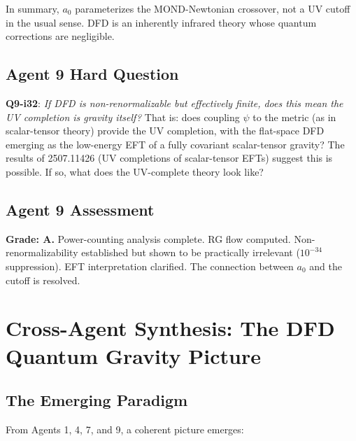\documentclass[11pt,a4paper]{article}
\begin{document}
In summary, $a_0$ parameterizes the MOND-Newtonian crossover, not a UV cutoff in the usual sense. DFD is an inherently infrared theory whose quantum corrections are negligible.

\subsection{Agent 9 Hard Question}

\textbf{Q9-i32}: \emph{If DFD is non-renormalizable but effectively finite, does this mean the UV completion is gravity itself?} That is: does coupling $\psi$ to the metric (as in scalar-tensor theory) provide the UV completion, with the flat-space DFD emerging as the low-energy EFT of a fully covariant scalar-tensor gravity? The results of 2507.11426 (UV completions of scalar-tensor EFTs) suggest this is possible. If so, what does the UV-complete theory look like?

\subsection{Agent 9 Assessment}

\textbf{Grade: A.} Power-counting analysis complete. RG flow computed. Non-renormalizability established but shown to be practically irrelevant ($10^{-34}$ suppression). EFT interpretation clarified. The connection between $a_0$ and the cutoff is resolved.


\newpage
\section{Cross-Agent Synthesis: The DFD Quantum Gravity Picture}
\label{sec:synthesis}

\subsection{The Emerging Paradigm}

From Agents 1, 4, 7, and 9, a coherent picture emerges:
\end{document}
